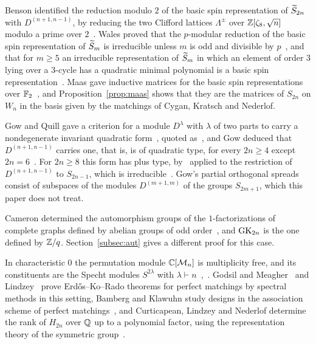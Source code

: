 Benson identified the reduction modulo $2$ of the basic spin representation of $\widetilde{S}_{2n}$ with $D^{(n+1,n-1)}$, by reducing the two Clifford lattices $\Lambda^\pm$ over $\mathbb{Z}[\zeta_8,\sqrt n]$ modulo a prime over $2$~\cite[\S\S4--5, Thm.~5.1]{Benson88}. Wales proved that the $p$-modular reduction of the basic spin representation of $\widetilde{S}_m$ is irreducible unless $m$ is odd and divisible by $p$~\cite[Thm.~7.7]{Wales79}, and that for $m\ge5$ an irreducible representation of $\widetilde{S}_m$ in which an element of order $3$ lying over a $3$-cycle has a quadratic minimal polynomial is a basic spin representation~\cite[Thm.~8.1]{Wales79}. Maas gave inductive matrices for the basic spin representations over $\mathbb{F}_2$~\cite[Table~1, Cor.~13]{Maas10}, and Proposition~\ref{prop:maas} shows that they are the matrices of $S_{2n}$ on $W_n$ in the basis given by the matchings of Cygan, Kratsch and Nederlof.

Gow and Quill gave a criterion for a module $D^\lambda$ with $\lambda$ of two parts to carry a nondegenerate invariant quadratic form~\cite[Thm.~1]{GQ04}, quoted as~\cite[Lemma~1]{Gow16}, and Gow deduced that $D^{(n+1,n-1)}$ carries one, that is, is of quadratic type, for every $2n\ge4$ except $2n=6$~\cite[Lemma~2]{Gow16}. For $2n\ge8$ this form has plus type, by~\cite[Lemma~3]{Gow16} applied to the restriction of $D^{(n+1,n-1)}$ to $S_{2n-1}$, which is irreducible~\cite[\S2]{Gow16}. Gow's partial orthogonal spreads~\cite[Thm.~1]{Gow16} consist of subspaces of the modules $D^{(m+1,m)}$ of the groups $S_{2m+1}$, which this paper does not treat.

Cameron determined the automorphism groups of the $1$-factorizations of complete graphs defined by abelian groups of odd order~\cite[Thm.~2.2]{Cameron75}, and $\mathrm{GK}_{2n}$ is the one defined by $\mathbb{Z}/q$. Section~\ref{subsec:aut} gives a different proof for this case.

In characteristic $0$ the permutation module $\mathbb C[\mathcal{M}_n]$ is multiplicity free, and its constituents are the Specht modules $S^{2\lambda}$ with $\lambda\vdash n$~\cite[\S4]{Lindzey14},~\cite[\S1, eq.~(2)]{Srinivasan18}. Godsil and Meagher~\cite{GM15} and Lindzey~\cite{Lindzey14} prove Erd\H{o}s--Ko--Rado theorems for perfect matchings by spectral methods in this setting, Bamberg and Klawuhn study designs in the association scheme of perfect matchings~\cite{BK26}, and Curticapean, Lindzey and Nederlof determine the rank of $H_{2n}$ over $\mathbb{Q}$ up to a polynomial factor, using the representation theory of the symmetric group~\cite{CLN17}. %

